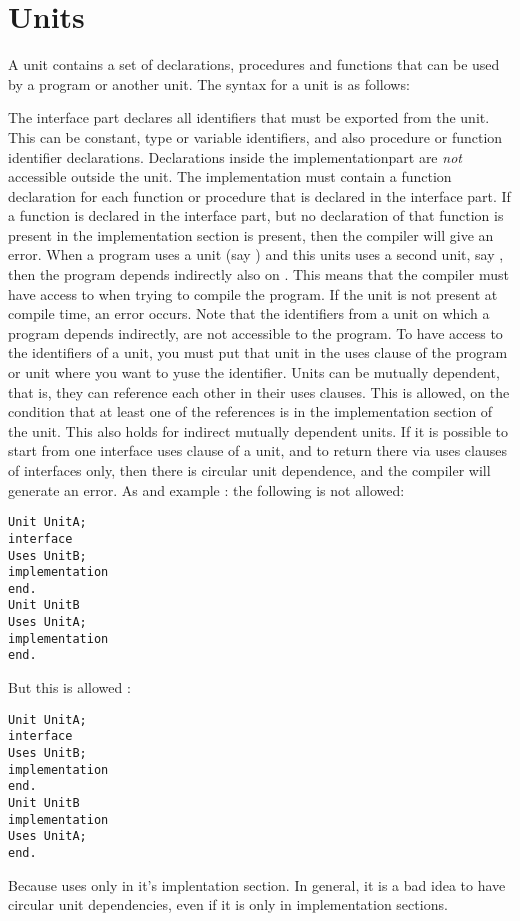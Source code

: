 \documentclass{report}
\begin{document}
\section{Units}
A unit contains a set of declarations, procedures and functions that can be
used by a program or another unit.
The syntax for a unit is as follows:

The interface part declares all identifiers that must be exported from the
unit. This can be constant, type or variable identifiers, and also procedure
or function identifier declarations. Declarations inside the
implementationpart are {\em not} accessible outside the unit. The
implementation must contain a function declaration for each function or
procedure that is declared in the interface part. If a function is declared
in the interface part, but no declaration of that function is present in the
implementation section is present, then the compiler will give an error.
When a program uses a unit (say ) and this units uses a second
unit, say , then the program depends indirectly also on
. This means that the compiler must have access to  when
trying to compile the program. If the unit is not present at compile time,
an error occurs.
Note that the identifiers from a unit on which a program depends indirectly,
are not accessible to the program. To have access to the identifiers of a
unit, you must put that unit in the uses clause of the program or unit where
you want to yuse the identifier.
Units can be mutually dependent, that is, they can reference each other in
their uses clauses. This is allowed, on the condition that at least one of
the references is in the implementation section of the unit. This also holds
for indirect mutually dependent units.
If it is possible to start from one interface uses clause of a unit, and to return
there via uses clauses of interfaces only, then there is circular unit
dependence, and the compiler will generate an error.
As and example : the following is not allowed:
\begin{verbatim}
Unit UnitA;
interface
Uses UnitB;
implementation
end.
Unit UnitB
Uses UnitA;
implementation
end.
\end{verbatim}
But this is allowed :
\begin{verbatim}
Unit UnitA;
interface
Uses UnitB;
implementation
end.
Unit UnitB
implementation
Uses UnitA;
end.
\end{verbatim}
Because  uses  only in it's implentation section.
In general, it is a bad idea to have circular unit dependencies, even if it is
only in implementation sections.
\end{document}

